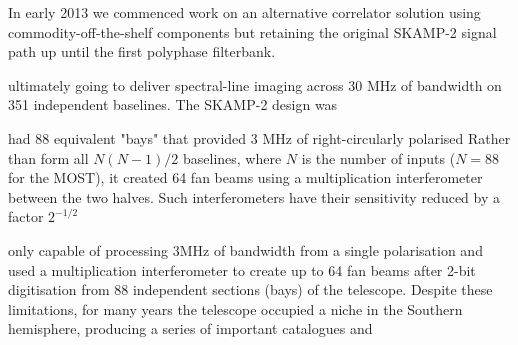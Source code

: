 In early 2013 we commenced work on an alternative correlator solution using commodity-off-the-shelf components but retaining the original SKAMP-2 signal path up until the first polyphase filterbank. 

ultimately going to deliver spectral-line imaging across 30 MHz of bandwidth on 351 independent baselines\cite{Adams_2004}. The SKAMP-2 design was 


had 88 equivalent "bays" that provided 3 MHz of right-circularly polarised Rather than form all $N(N-1)/2$ baselines, where $N$ is the number of inputs ($N=88$ for the MOST), it created 64 fan beams using a multiplication interferometer between the two halves. Such interferometers have their sensitivity reduced by a factor $2^{-1/2}$ 

only capable of processing 3MHz of bandwidth from a single polarisation and used a multiplication interferometer to create up to 64 fan beams after 2-bit digitisation from 88 independent sections (bays) of the telescope. Despite these limitations, for many years the telescope occupied a niche in the Southern hemisphere, producing a series of important catalogues and  

